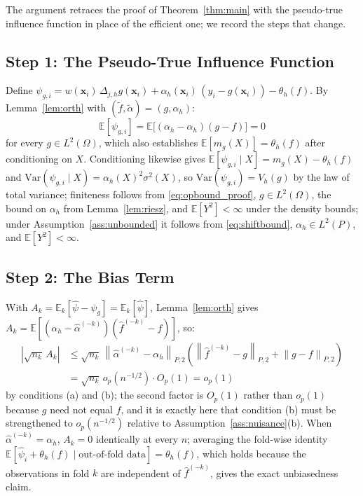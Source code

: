\documentclass[12pt]{article}
\newcommand{\norm}[1]{\left\| #1 \right\|}
\newcommand{\E}{\mathbb{E}}
\newcommand{\abs}[1]{\left| #1 \right|}
\newcommand{\Dh}{\Delta_{j,h}}
\newcommand{\Ptwo}[1]{\norm{#1}_{P,2}}
\begin{document}
	The argument retraces the proof of Theorem~\ref{thm:main} with the pseudo-true
	influence function in place of the efficient one; we record the steps that change.
	
	\subsection{Step 1: The Pseudo-True Influence Function}
	
	Define $\psi_{g,i} = w(\mathbf{x}_i)\, \Dh g(\mathbf{x}_i)
	+ \alpha_h(\mathbf{x}_i)\,(y_i - g(\mathbf{x}_i)) - \theta_h(f)$. By
	Lemma~\ref{lem:orth} with $(\tilde{f}, \tilde{\alpha}) = (g, \alpha_h)$:
	\begin{equation}
		\E[\psi_{g,i}]
		= \E\bigl[(\alpha_h - \alpha_h)(g - f)\bigr] = 0
	\end{equation}
	for every $g \in L^2(\Omega)$, which also establishes
	$\E[m_g(X)] = \theta_h(f)$ after conditioning on $X$. Conditioning likewise gives
	$\E[\psi_{g,i} \mid X] = m_g(X) - \theta_h(f)$ and
	$\mathrm{Var}(\psi_{g,i} \mid X) = \alpha_h(X)^2 \sigma^2(X)$, so
	$\mathrm{Var}(\psi_{g,i}) = V_h(g)$ by the law of total variance; finiteness
	follows from \eqref{eq:opbound_proof}, $g \in L^2(\Omega)$, the bound on
	$\alpha_h$ from Lemma~\ref{lem:riesz}, and $\E[Y^2] < \infty$ under the density
	bounds; under Assumption~\ref{ass:unbounded} it follows from
	\eqref{eq:shiftbound}, $\alpha_h \in L^2(P)$, and $\E[Y^2] < \infty$.
	
	\subsection{Step 2: The Bias Term}
	
	With $A_k = \E_k[\hat{\psi} - \psi_g] = \E_k[\hat{\psi}]$, Lemma~\ref{lem:orth}
	gives $A_k = \E[(\alpha_h - \hat{\alpha}^{(-k)})(\hat{f}^{(-k)} - f)]$, so:
	\begin{equation}
		\begin{split}
			\abs{\sqrt{n_k}\, A_k}
			&\leq \sqrt{n_k}\, \Ptwo{\hat{\alpha}^{(-k)} - \alpha_h}
			\left( \Ptwo{\hat{f}^{(-k)} - g} + \Ptwo{g - f} \right) \\
			&= \sqrt{n_k}\, o_p(n^{-1/2}) \cdot O_p(1) = o_p(1)
		\end{split}
	\end{equation}
	by conditions (a) and (b); the second factor is $O_p(1)$ rather than $o_p(1)$
	because $g$ need not equal $f$, and it is exactly here that condition (b) must be
	strengthened to $o_p(n^{-1/2})$ relative to Assumption~\ref{ass:nuisance}(b).
	When $\hat{\alpha}^{(-k)} = \alpha_h$, $A_k = 0$ identically at every $n$;
	averaging the fold-wise identity
	$\E[\hat{\psi}_i + \theta_h(f) \mid \text{out-of-fold data}] = \theta_h(f)$,
	which holds because the observations in fold $k$ are independent of
	$\hat{f}^{(-k)}$, gives the exact unbiasedness claim.
	
\end{document}
